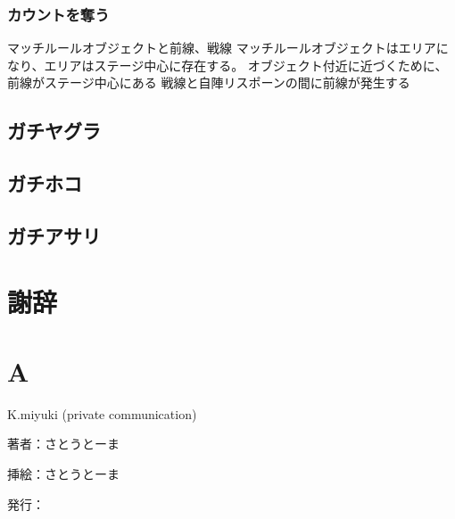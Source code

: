 \documentclass[a4paper,11pt]{jsbook}
\begin{document}
\subsection{カウントを奪う}
マッチルールオブジェクトと前線、戦線
マッチルールオブジェクトはエリアになり、エリアはステージ中心に存在する。
オブジェクト付近に近づくために、前線がステージ中心にある
戦線と自陣リスポーンの間に前線が発生する


\section{ガチヤグラ}
\section{ガチホコ}
\section{ガチアサリ}


\chapter{謝辞}

\appendix
\chapter{A}



\begin{thebibliography}{2}

K.miyuki (private communication)
\end{thebibliography}

\thispagestyle{empty}
\begin{flushright}
\begin{minipage}{0.5\hsize}
\begin{description}
  \item{著者：}さとうとーま
  \item{挿絵：}さとうとーま
  \item{発行：}\date{\today}
\end{description}
\end{minipage}
\end{flushright}
\end{document}
